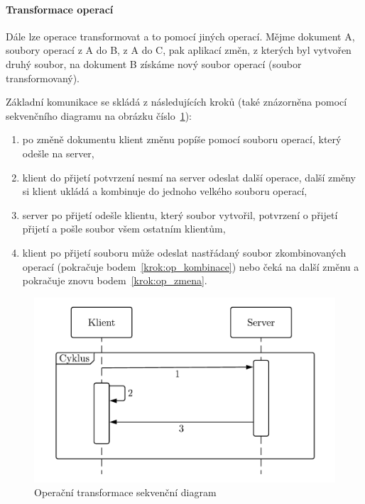 \paragraph{Transformace operací}
Dále lze operace transformovat a to pomocí jiných operací.
Mějme dokument A, soubory operací z A do B, z A do C, pak aplikací změn, z kterých byl vytvořen druhý soubor, na dokument B získáme nový soubor operací (soubor transformovaný).~\cite{ot:codecommit}


Základní komunikace se skládá z následujících kroků (také znázorněna pomocí sekvenčního diagramu na obrázku číslo~\ref{fig:OP_diagram}):

\begin{enumerate}
    \item po změně dokumentu klient změnu popíše pomocí souboru operací, který odešle na server,\label{krok:op_zmena}
    \item klient do přijetí potvrzení nesmí na server odeslat další operace, další změny si klient ukládá a kombinuje do jednoho velkého souboru operací,\label{krok:op_kombinace}
    \item server po přijetí odešle klientu, který soubor vytvořil, potvrzení o přijetí přijetí a pošle soubor všem ostatním klientům,
    \item klient po přijetí souboru může odeslat nastřádaný soubor zkombinovaných operací (pokračuje bodem~\ref{krok:op_kombinace}) nebo čeká na další změnu a pokračuje znovu bodem~\ref{krok:op_zmena}.~\cite{ot:waveAddition}
\end{enumerate}

\begin{figure}[ht]
    \centering
    \includegraphics[width=\textwidth]{partials/analyza/OP_diagram.pdf}
    \caption{Operační transformace sekvenční diagram}\label{fig:OP_diagram}
\end{figure}

